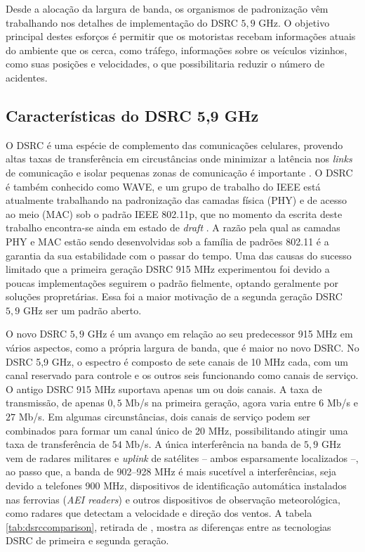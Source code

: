 Desde a alocação da largura de banda, os organismos de padronização vêm
trabalhando nos detalhes de implementação do DSRC $5,9$ GHz. O objetivo
principal destes esforços é permitir que os motoristas recebam informações
atuais do ambiente que os cerca, como tráfego, informações sobre os veículos
vizinhos, como suas posições e velocidades, o que possibilitaria reduzir
o número de acidentes.

\subsection{Características do DSRC 5,9 GHz}
O DSRC é uma espécie de complemento das comunicações celulares, provendo altas
taxas de transferência em circustâncias onde minimizar a latência nos
\textit{links} de comunicação e isolar pequenas zonas de
comunicação é importante \cite{guo2006vehicular}. O DSRC é também conhecido
como WAVE, e um grupo de trabalho do IEEE está atualmente trabalhando na
padronização das camadas física (PHY) e de acesso ao meio (MAC) sob o padrão
IEEE 802.11p, que no momento da escrita deste trabalho encontra-se ainda em
estado de \textit{draft} \cite{80211p}. A razão pela qual as
camadas PHY e MAC estão sendo desenvolvidas sob a família de padrões 802.11 é a
garantia da sua estabilidade com o passar do tempo. Uma das causas do sucesso
limitado que a primeira geração DSRC 915 MHz experimentou foi devido a poucas
implementações seguirem o padrão fielmente, optando geralmente por soluções
propretárias. Essa foi a maior motivação de a segunda geração DSRC $5,9$ GHz
ser um padrão aberto.

O novo DSRC $5,9$ GHz é um avanço em relação ao seu predecessor 915 MHz em
vários aspectos, como a própria largura de banda, que é maior no novo DSRC. No
DSRC 5,9 GHz, o espectro é composto de sete canais de 10 MHz cada, com um canal
reservado para controle e os outros seis funcionando como canais de serviço. O
antigo DSRC 915 MHz suportava apenas um ou dois canais. A taxa de transmissão,
de apenas $0,5$ Mb/s na primeira geração, agora varia entre $6$ Mb/s e $27$
Mb/s. Em algumas circunstâncias, dois canais de serviço podem ser combinados
para formar um canal único de 20 MHz, possibilitando atingir uma taxa de
transferência de $54$ Mb/s. A única interferência na banda de $5,9$ GHz vem de
radares militares e \textit{uplink} de satélites -- ambos esparsamente
localizados --, ao passo que, a banda de 902--928 MHz é mais sucetível a
interferências, seja devido a telefones 900 MHz, dispositivos de identificação
automática instalados nas ferrovias (\textit{AEI readers}) e outros dispositivos
de observação meteorológica, como radares que detectam a velocidade e direção
dos ventos.  A tabela \ref{tab:dsrccomparison}, retirada de \cite{guo2006vehicular},
mostra as diferenças entre as tecnologias DSRC de primeira e segunda geração.

